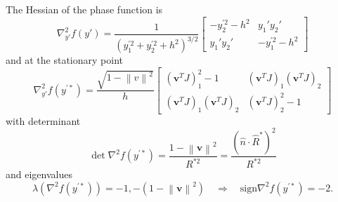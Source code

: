 \documentclass{article}
\newcommand{\norm}[1]{\left\lVert #1 \right\rVert}
\theoremstyle{plain}
\begin{document}
The Hessian of the phase function is
\begin{equation}
	\nabla^2_{y'} f(y') =
	\frac{1}{ \left( y_1^{'2} + y_2^{'2} + h^2 \right)^{3/2}}
	\begin{bmatrix}
		-y_2^{'2} - h^2 & y_1'y_2' \\
		y_1'y_2' & -y_1^{'2} - h^2 
	\end{bmatrix}
\end{equation}
and at the stationary point
\begin{equation}
	\nabla^2_{y'} f(y^{'*}) =
	\frac{\sqrt{1-\norm{v}^2}}{h}
	\begin{bmatrix}
		(\mathbf{v}^TJ)_1^2 - 1 & (\mathbf{v}^TJ)_1(\mathbf{v}^TJ)_2 \\
		(\mathbf{v}^TJ)_1(\mathbf{v}^TJ)_2 & (\mathbf{v}^TJ)_2^2 - 1
	\end{bmatrix}
\end{equation}
with determinant
\begin{equation}
	\det \nabla^2 f(y^{'*})
	= \frac{1-\norm{\mathbf{v}}^2}{R^{*2}}
	= \frac{\left(\hat{n}\cdot\hat{R}^*\right)^2}{R^{*2}}
\end{equation}
and eigenvalues
\begin{equation}
	\lambda\left( \nabla^2 f(y^{'*}) \right) = 
	-1, -\left( 1-\norm{\mathbf{v}}^2 \right)
	\quad\Rightarrow\quad \text{sign}\nabla^2 f(y^{'*}) = -2.
\end{equation}
\end{document}
